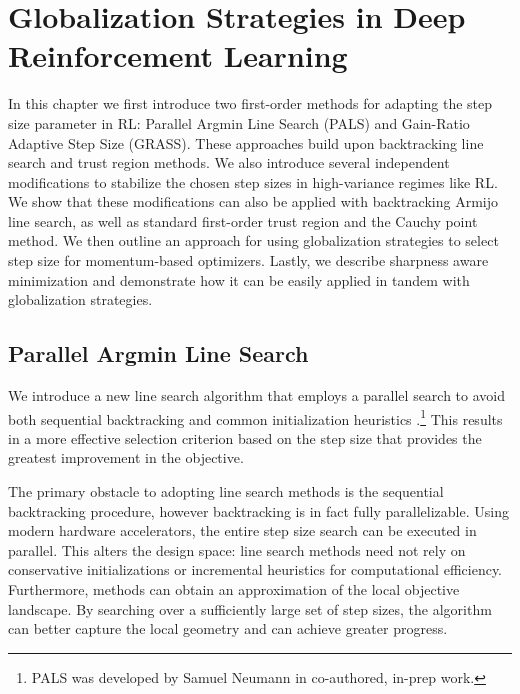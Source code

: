 \chapter{Globalization Strategies in Deep Reinforcement Learning} \label{sec: methods}
In this chapter we first introduce two first-order methods for adapting the step size parameter in RL: Parallel Argmin Line Search (PALS) and Gain-Ratio Adaptive Step Size (GRASS). These approaches build upon backtracking line search and trust region methods. We also introduce several independent modifications to stabilize the chosen step sizes in high-variance regimes like RL. We show that these modifications can also be applied with backtracking Armijo line search, as well as standard first-order trust region and the Cauchy point method. We then outline an approach for using globalization strategies to select step size for momentum-based optimizers. Lastly, we describe sharpness aware minimization and demonstrate how it can be easily applied in tandem with globalization strategies.

\section{Parallel Argmin Line Search} \label{sec: pals}
We introduce a new line search algorithm that employs a parallel search to avoid both sequential backtracking and common initialization heuristics \cite{vaswani2019painless,galli2023monotone}.\footnote{PALS was developed by Samuel Neumann in co-authored, in-prep work.} This results in a more effective selection criterion based on the step size that provides the greatest improvement in the objective.

The primary obstacle to adopting line search methods is the sequential backtracking procedure, however backtracking is in fact fully parallelizable. Using modern hardware accelerators, the entire step size search can be executed in parallel. This alters the design space: line search methods need not rely on conservative initializations or incremental heuristics for computational efficiency. Furthermore, methods can obtain an approximation of the local objective landscape. By searching over a sufficiently large set of step sizes, the algorithm can better capture the local geometry and can achieve greater progress.

